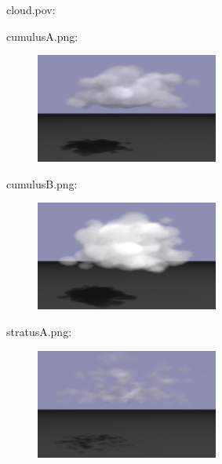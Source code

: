 cloud.pov:\\
\begin{scriptsize}
\begin{ttfamily}

\end{ttfamily}
\end{scriptsize}

cumulusA.png:\\
\begin{center}
\begin{figure}[H]
\centering\includegraphics[width=6cm]{./cumulusA.png}\\
\end{figure}
\end{center}

cumulusB.png:\\
\begin{center}
\begin{figure}[H]
\centering\includegraphics[width=6cm]{./cumulusB.png}\\
\end{figure}
\end{center}

stratusA.png:\\
\begin{center}
\begin{figure}[H]
\centering\includegraphics[width=6cm]{./stratusA.png}\\
\end{figure}
\end{center}

